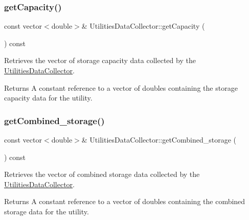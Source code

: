 \mbox{\label{classUtilitiesDataCollector_a48369552a48650ea015b3ff18da5175f}} 
\subsubsection{\texorpdfstring{get\+Capacity()}{getCapacity()}}
{\footnotesize\ttfamily const vector$<$double$>$\& Utilities\+Data\+Collector\+::get\+Capacity (\begin{DoxyParamCaption}{ }\end{DoxyParamCaption}) const}



Retrieves the vector of storage capacity data collected by the {\ttfamily \mbox{\hyperlink{classUtilitiesDataCollector}{Utilities\+Data\+Collector}}}. 

\begin{DoxyReturn}{Returns}
A constant reference to a vector of doubles containing the storage capacity data for the utility. 
\end{DoxyReturn}
\mbox{\label{classUtilitiesDataCollector_a9d1478c486b9be64fa452b34258e8b03}} 
\subsubsection{\texorpdfstring{get\+Combined\+\_\+storage()}{getCombined\_storage()}}
{\footnotesize\ttfamily const vector$<$double$>$\& Utilities\+Data\+Collector\+::get\+Combined\+\_\+storage (\begin{DoxyParamCaption}{ }\end{DoxyParamCaption}) const}



Retrieves the vector of combined storage data collected by the {\ttfamily \mbox{\hyperlink{classUtilitiesDataCollector}{Utilities\+Data\+Collector}}}. 

\begin{DoxyReturn}{Returns}
A constant reference to a vector of doubles containing the combined storage data for the utility. 
\end{DoxyReturn}
\mbox{\label{classUtilitiesDataCollector_a9cb52112e6175775842474e80a37023d}} 
